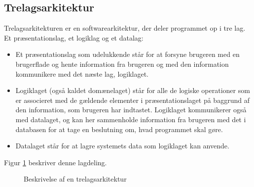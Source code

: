 \subsection{Trelagsarkitektur}
Trelagsarkitekturen er en softwarearkitektur, der deler programmet op i tre lag.
Et præsentationslag, et logiklag og et datalag: 
\begin{itemize}
    \item Et præsentationslag som udelukkende står for at forsyne brugeren med
        en brugerflade og hente information fra brugeren og med den information
        kommunikere med det næste lag, logiklaget.
    \item Logiklaget (også kaldet domænelaget) står for alle de logiske
        operationer som er associeret med de gældende elementer i
        præsentationslaget på baggrund af den information, som brugeren har
        indtastet. Logiklaget kommunikerer også med datalaget, og kan her
        sammenholde information fra brugeren med det i databasen for at tage en
        beslutning om, hvad programmet skal gøre.
    \item Datalaget står for at lagre systemets data som logiklaget kan anvende.
\end{itemize}

Figur \ref{fig:trelagsarkitekur} beskriver denne lagdeling. 

\begin{figure}[H]
    \centering
    \caption{Beskrivelse af en trelagsarkitektur}
    \label{fig:trelagsarkitekur}
\end{figure}

